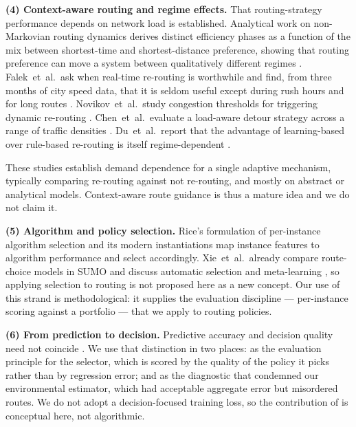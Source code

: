 \documentclass[10pt,a4paper]{article}
\begin{document}
\textbf{(4) Context-aware routing and regime effects.} That routing-strategy performance depends on network load is established. Analytical work on non-Markovian routing dynamics derives distinct efficiency phases as a function of the mix between shortest-time and shortest-distance preference, showing that routing preference can move a system between qualitatively different regimes \cite{routing2026phase}. Falek~et~al.\ ask when real-time re-routing is worthwhile and find, from three months of city speed data, that it is seldom useful except during rush hours and for long routes \cite{falek2021reroute}. Novikov~et~al.\ study congestion thresholds for triggering dynamic re-routing \cite{novikov2018dynamic}. Chen~et~al.\ evaluate a load-aware detour strategy across a range of traffic densities \cite{chen2025detour}. Du~et~al.\ report that the advantage of learning-based over rule-based re-routing is itself regime-dependent \cite{du2023fogcloud}.

These studies establish demand dependence for a single adaptive mechanism, typically comparing re-routing against not re-routing, and mostly on abstract or analytical models. Context-aware route guidance is thus a mature idea and we do not claim it.

\textbf{(5) Algorithm and policy selection.} Rice's formulation of per-instance algorithm selection \cite{rice1976algorithm} and its modern instantiations \cite{bischl2016aslib,xu2008satzilla} map instance features to algorithm performance and select accordingly. Xie~et~al.\ already compare route-choice models in SUMO and discuss automatic selection and meta-learning \cite{xie2014unified}, so applying selection to routing is not proposed here as a new concept. Our use of this strand is methodological: it supplies the evaluation discipline --- per-instance scoring against a portfolio --- that we apply to routing policies.

\textbf{(6) From prediction to decision.} Predictive accuracy and decision quality need not coincide \cite{elmachtoub2022smart}. We use that distinction in two places: as the evaluation principle for the selector, which is scored by the quality of the policy it picks rather than by regression error; and as the diagnostic that condemned our environmental estimator, which had acceptable aggregate error but misordered routes. We do not adopt a decision-focused training loss, so the contribution of \cite{elmachtoub2022smart} is conceptual here, not algorithmic.
\end{document}
